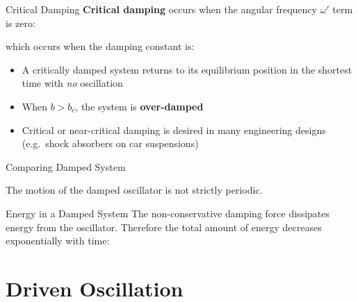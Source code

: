 \documentclass[12pt,compress,aspectratio=169]{beamer}
\begin{document}
\begin{frame}{Critical Damping}
  \textbf{Critical damping} occurs when the angular frequency $\omega'$ term
  is zero:
  

  which occurs when the damping constant is:

  \begin{itemize}
  \item\vspace{-.1in}A critically damped system returns to its equilibrium
    position in the shortest time with \emph{no} oscillation
  \item When $b>b_c$, the system is \textbf{over-damped}
  \item Critical or near-critical damping is desired in many engineering designs
    (e.g.\ shock absorbers on car suspensions)
  \end{itemize}
\end{frame}



\begin{frame}{Comparing Damped System}
  \begin{center}
  \end{center}
  The motion of the damped oscillator is not strictly periodic.
\end{frame}



\begin{frame}{Energy in a Damped System}
  The non-conservative damping force dissipates energy from the oscillator.
  Therefore the total amount of energy decreases exponentially with time:

\end{frame}



\section{Driven Oscillation}
\end{document}
